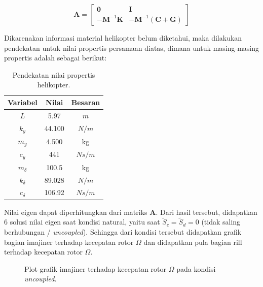 \begin{equation}
	\mathbf{A}=\begin{bmatrix}
	\mathbf{0}& \mathbf{I}\\
	\mathbf{-M}^{-1}\mathbf{K}& \mathbf{-M}^{-1}(\mathbf{C}+\mathbf{G})
	\end{bmatrix}
\end{equation}

Dikarenakan informasi material helikopter belum diketahui, maka dilakukan pendekatan untuk nilai propertis persamaan diatas, dimana untuk masing-masing propertis adalah sebagai berikut:

\begin{table}[H]
	\centering
	\caption{Pendekatan nilai propertis helikopter.}
	\label{tb:propertis}
	\begin{tabular}{|c|c|c|}
		\hline
		Variabel     & Nilai  	& Besaran \\ \hline
		$L$          & 5.97  	& $m$     \\ \hline
		$k_y$        & 44.100  	& $N/m$   \\ \hline
		$m_y$        & 4.500   	& kg      \\ \hline
		$c_y$        & 441    	& $Ns/m$  \\ \hline
		$m_{\delta}$ & 100.5  	& kg      \\ \hline
		$k_{\delta}$ & 89.028  	& $N/m$   \\ \hline
		$c_{\delta}$ & 106.92 	& $Ns/m$  \\ \hline
	\end{tabular}
\end{table}

Nilai eigen dapat diperhitungkan dari matriks $\mathbf{A}$. Dari hasil tersebut, didapatkan 6 solusi nilai eigen saat kondisi natural, yaitu saat $\tilde{S}_c = \tilde{S}_d = 0$ (tidak saling berhubungan / \textit{uncoupled}). Sehingga dari kondisi tersebut didapatkan grafik bagian imajiner terhadap kecepatan rotor $\Omega$ dan didapatkan pula bagian rill terhadap kecepatan rotor $\Omega$.

\begin{figure}[H]
	\centering
	\caption{Plot grafik imajiner terhadap kecepatan rotor $\Omega$ pada kondisi \textit{uncoupled}.}
	\label{fig:imag(uncoupled)}
\end{figure}


